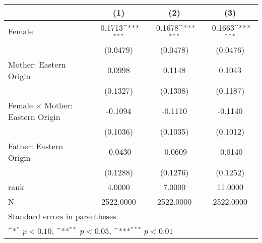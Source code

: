 {
\def\sym#1{\ifmmode^{#1}\else\(^{#1}\)\fi}
\begin{tabular}{l*{3}{c}}
\toprule
                    &\multicolumn{1}{c}{(1)}         &\multicolumn{1}{c}{(2)}         &\multicolumn{1}{c}{(3)}         \\
\midrule
Female              &     -0.1713\sym{***}&     -0.1678\sym{***}&     -0.1663\sym{***}\\
                    &    (0.0479)         &    (0.0478)         &    (0.0476)         \\
\addlinespace
Mother: Eastern Origin&      0.0998         &      0.1148         &      0.1043         \\
                    &    (0.1327)         &    (0.1308)         &    (0.1187)         \\
\addlinespace
Female $\times$ Mother: Eastern Origin&     -0.1094         &     -0.1110         &     -0.1140         \\
                    &    (0.1036)         &    (0.1035)         &    (0.1012)         \\
\addlinespace
Father: Eastern Origin&     -0.0430         &     -0.0609         &     -0.0140         \\
                    &    (0.1288)         &    (0.1276)         &    (0.1252)         \\
\midrule
rank                &      4.0000         &      7.0000         &     11.0000         \\
N                   &   2522.0000         &   2522.0000         &   2522.0000         \\
\bottomrule
\multicolumn{4}{l}{\footnotesize Standard errors in parentheses}\\
\multicolumn{4}{l}{\footnotesize \sym{*} \(p<0.10\), \sym{**} \(p<0.05\), \sym{***} \(p<0.01\)}\\
\end{tabular}
}
